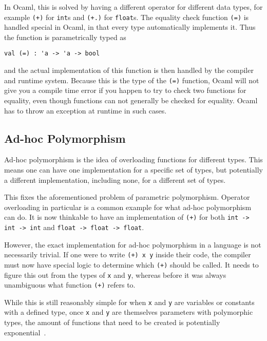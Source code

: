 In Ocaml, this is solved by having a different operator for different data types, for example \verb|(+)| for \verb|int|s and \verb|(+.)| for \verb|float|s. The equality check function \verb|(=)| is handled special in Ocaml, in that every type automatically implements it. Thus the function is parametrically typed as
\begin{verbatim}
val (=) : 'a -> 'a -> bool
\end{verbatim}
and the actual implementation of this function is then handled by the compiler and runtime system. Because this is the type of the \verb|(=)| function, Ocaml will not give you a compile time error if you happen to try to check two functions for equality, even though functions can not generally be checked for equality. Ocaml has to throw an exception at runtime in such cases.

\subsection{Ad-hoc Polymorphism}

Ad-hoc polymorphism is the idea of overloading functions for different types. This means one can have one implementation for a specific set of types, but potentially a different implementation, including none, for a different set of types.

This fixes the aforementioned problem of parametric polymorphism. Operator overloading in particular is a common example for what ad-hoc polymorphism can do. It is now thinkable to have an implementation of \verb|(+)| for both \verb|int -> int -> int| and \verb|float -> float -> float|.

However, the exact implementation for ad-hoc polymorphism in a language is not necessarily trivial. If one were to write \verb|(+) x y| inside their code, the compiler must now have special logic to determine which \verb|(+)| should be called. It needs to figure this out from the types of \verb|x| and \verb|y|, whereas before it was always unambiguous what function \verb|(+)| refers to.

While this is still reasonably simple for when \verb|x| and \verb|y| are variables or constants with a defined type, once \verb|x| and \verb|y| are themselves parameters with polymorphic types, the amount of functions that need to be created is potentially exponential~\cite{type-classes-original}.


